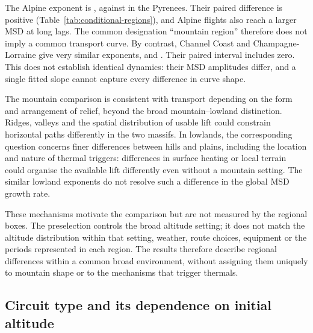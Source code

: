 The Alpine exponent is \CondAlpsH{}, against \CondPyreneesH{} in the Pyrenees.
Their paired difference is positive (Table~\ref{tab:conditional-regions}), and
Alpine flights also reach a larger MSD at long lags. The common designation
``mountain region'' therefore does not imply a common transport curve. By
contrast, Channel Coast and Champagne-Lorraine give very similar exponents,
\CondChannelCoastH{} and \CondChampagneLorraineH{}. Their paired interval includes
zero. This does not establish identical dynamics: their MSD amplitudes differ,
and a single fitted slope cannot capture every difference in curve shape.

\begin{table}[htbp]
 \centering\small
 
 \caption{Paired regional contrasts in $H$, after the terrain preselection:
 Low/High mountains for Alps--Pyrenees and Plains/Hills for the two lowland
 regions. Intervals are nominal 90\% site--day bootstrap intervals.}
 \label{tab:conditional-regions}
\end{table}

The mountain comparison is consistent with transport depending on the form and
arrangement of relief, beyond the broad mountain--lowland distinction. Ridges,
valleys and the spatial distribution of usable lift could constrain horizontal
paths differently in the two massifs. In lowlands, the corresponding question
concerns finer differences between hills and plains, including the location and
nature of thermal triggers: differences in surface heating or local terrain
could organise the available lift differently even without a mountain setting.
The similar lowland exponents do not resolve such a difference in the global
MSD growth rate.

These mechanisms motivate the comparison but are not measured by the regional
boxes. The preselection controls the broad altitude setting; it does not match
the altitude distribution within that setting, weather, route choices, equipment
or the periods represented in each region. The results therefore describe
regional differences within a common broad environment, without assigning them
uniquely to mountain shape or to the mechanisms that trigger thermals.

\FloatBarrier
\subsection{Circuit type and its dependence on initial altitude}
\label{sec:conditional-circuit}

